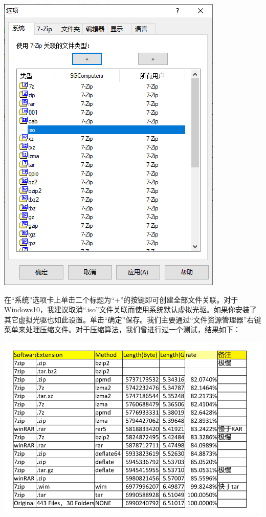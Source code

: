 \begin{center}
	\includegraphics[scale=0.7]{pic/7zopt.PNG}
\end{center} \par
在“系统”选项卡上单击二个标题为“+”的按键即可创建全部文件关联。对于Windows10，我建议取消“.iso”文件关联而使用系统默认虚拟光驱。如果你安装了其它虚拟光驱也如此设置。单击“确定”保存。我们主要通过“文件资源管理器”右键菜单来处理压缩文件。对于压缩算法，我们曾进行过一个测试，结果如下：
\begin{center}
\includegraphics[scale=0.55]{pic/ziprate.PNG}	
\end{center} \par
